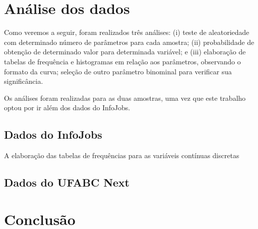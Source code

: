 	\chapter{Análise dos dados}
	
	Como veremos a seguir, foram realizados três análises: (i) teste de aleatoriedade com determinado número de parâmetros para cada amostra; (ii) probabilidade de obtenção de determinado valor para determinada variável; e (iii) elaboração de tabelas de frequência e histogramas em relação aos parâmetros, observando o formato da curva; seleção de outro parâmetro binominal para verificar sua significância.
	
	Os análises foram realizadas para as duas amostras, uma vez que este trabalho optou por ir além dos dados do InfoJobs.
	
	\section{Dados do InfoJobs}
	
	A elaboração das tabelas de frequências para as variáveis contínuas discretas
	
	\section{Dados do UFABC Next}
	
	\chapter{Conclusão}


	
	\postextual
	
	
	
	
	\renewcommand{\glossaryname}{Glossário}
	\renewcommand*{\glsseeformat}[3][\seename]{\textit{#1}
		\glsseelist{#2}}
	

